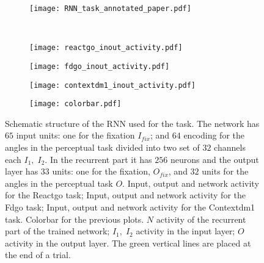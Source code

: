 \documentclass[11pt,a4paper]{article}
\begin{document}
\begin{figure}
 \centering
 \begin{subfigure}[b]{0.80\textwidth}
   \centering
   \texttt{[image: RNN\_task\_annotated\_paper.pdf]}
   \subcaption{}\label{fig:RNN_task:RNN_structure}
 \end{subfigure}\\
 \begin{subfigure}[b]{0.29\textwidth}
   \centering
   \texttt{[image: reactgo\_inout\_activity.pdf]}
   \subcaption{}\label{fig:RNN_task:reactgo}
 \end{subfigure}
 \begin{subfigure}[b]{0.29\textwidth}
   \centering
   \texttt{[image: fdgo\_inout\_activity.pdf]}
   \subcaption{}\label{fig:RNN_task:fdgo}
 \end{subfigure}
\begin{subfigure}[b]{0.29\textwidth}
   \centering
   \texttt{[image: contextdm1\_inout\_activity.pdf]}
   \subcaption{}\label{fig:RNN_task:contextdm1}
\end{subfigure}
\begin{subfigure}[b]{0.10\textwidth}
   \centering
   \texttt{[image: colorbar.pdf]}
   \subcaption{}\label{fig:RNN_task:colorbar}
\end{subfigure}
\caption{
   Schematic structure of the RNN used for the task.
  The network has $65$ input units: one for the fixation $I_{fix}$;
   and $64$ encoding for the angles in the perceptual task divided into two set of $32$ channels each $I_1,\; I_2$. 
  In the recurrent part it has $256$ neurons and the output layer has $33$ units: one for the fixation, $O_{fix}$,
  and $32$ units for the angles in the perceptual task $O$.
   Input, output and network activity for the Reactgo task;
   Input, output and network activity for the Fdgo task;
   Input, output and network activity for the Contextdm1 task.
   Colorbar for the previous plots.
  $N$ activity of the recurrent part of the trained network;
  $I_1,\;I_2$ activity in the input layer;
  $O$ activity in the output layer.
  The green vertical lines are placed at the end of a trial.
}\label{fig:RNN_task}
\end{figure}
\end{document}
